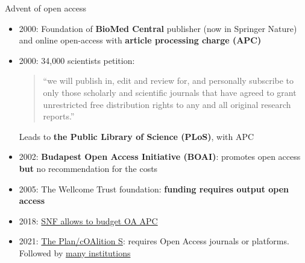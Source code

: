 \documentclass[10pt,compress,serif,aspectratio=169]{beamer}
\begin{document}
 \begin{frame}[t]{Advent of open access}
\begin{itemize}

\item 2000: Foundation of \textbf{BioMed Central} publisher (now in Springer Nature) and online open-access with \textbf{article processing charge (APC)}
\item 2000: 34,000 scientists petition:
  \begin{quote}
    “we will publish in, edit and review for, and personally subscribe to only those scholarly and scientific journals that have agreed to grant unrestricted free distribution rights to any and all original research reports.”
  \end{quote}
  Leads to \textbf{the Public Library of Science (PLoS)}, with APC

  \item 2002: \textbf{Budapest Open Access Initiative (BOAI)}: promotes open access \textbf{but} no recommendation for the costs
  \item 2005: The Wellcome Trust foundation: \textbf{funding requires output open access}
  \item 2018: \href{https://www.snf.ch/en/bQ17hb9mM1NC4awy/news/news-181010-make-open-access-the-new-normal}{SNF allows to budget OA APC}
  \item 2021: \href{https://www.coalition-s.org/}{The Plan/cOAlition S}: requires Open Access journals or platforms. Followed by \href{https://www.coalition-s.org/supporters/}{many institutions}
 \end{itemize}
\end{frame}
\end{document}
